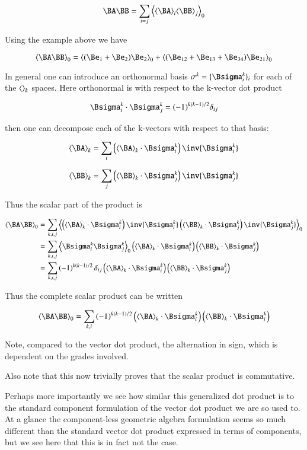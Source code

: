 \begin{equation}\label{eqn:scalar_commutes:scalarproduct}
\BA \BB 
= \sum_{i=j} \gpgradezero{\gpgrade{\BA}{i} \gpgrade{\BB}{j}}
\end{equation}

Using the example above we have

\[
\gpgradezero{\BA \BB}
= \gpgradezero{ (\Be_1 + \Be_2)\Be_2 }
+ \gpgradezero{ (\Be_{12} + \Be_{13} + \Be_{34})\Be_{21} }
\]

In general one can introduce an orthonormal basis 
$\sigma^k = \{\Bsigma_i^k\}_i$ for each of the ${\left\langle{{}}\right\rangle}_{k}$ spaces.
Here orthonormal is with respect to the k-vector dot product

\begin{equation}\label{eqn:scalar_commutes:orthonormal}
\Bsigma_i^k \cdot \Bsigma_j^k = (-1)^{k(k-1)/2}\delta_{ij}
\end{equation}

then one can decompose each of the k-vectors with respect to that
basis:

\[
\gpgrade{\BA}{k} = \sum_i \left(\gpgrade{\BA}{k} \cdot \Bsigma_i^k\right) \inv{\Bsigma_i^k}
\]

\[
\gpgrade{\BB}{k} = \sum_{j} \left(\gpgrade{\BB}{k} \cdot \Bsigma_{j}^k\right) \inv{\Bsigma_{j}^k}
\]

Thus the scalar part of the product is 

\begin{align*}
\gpgradezero{\BA \BB} 
&= \sum_{k, i, j} \gpgradezero {
\left(\gpgrade{\BA}{k} \cdot \Bsigma_{i}^k\right) \inv{\Bsigma_{i}^k}
\left(\gpgrade{\BB}{k} \cdot \Bsigma_{j}^k\right) \inv{\Bsigma_{j}^k}
} \\
&= \sum_{k, i, j}
\gpgradezero { \Bsigma_{i}^k \Bsigma_{j}^k } 
\left(\gpgrade{\BA}{k} \cdot \Bsigma_{i}^k\right)
\left(\gpgrade{\BB}{k} \cdot \Bsigma_{j}^k\right) \\
&= \sum_{k, i, j}
\left(-1\right)^{k\left(k-1\right)/2} \delta_{ij}
\left(\gpgrade{\BA}{k} \cdot \Bsigma_{i}^k\right)
\left(\gpgrade{\BB}{k} \cdot \Bsigma_{j}^k\right)
\end{align*}

Thus the complete scalar product can be written

\begin{equation}
\gpgradezero{\BA \BB} = \sum_{k, i}
\left(-1\right)^{k\left(k-1\right)/2}
\left(\gpgrade{\BA}{k} \cdot \Bsigma_{i}^k\right)
\left(\gpgrade{\BB}{k} \cdot \Bsigma_{i}^k\right)
\end{equation}

Note, compared to the vector dot product, the alternation in sign, which is
dependent on the grades involved.

Also note that this now trivially proves that the scalar product is commutative.

Perhaps more importantly we see how similar this generalized dot product is to the
standard component formulation of the vector dot product we are so used to.
At a glance the component-less geometric algebra formulation seems
so much different than the standard vector dot product expressed in terms of components, but
we see here that this is in fact not the case.


